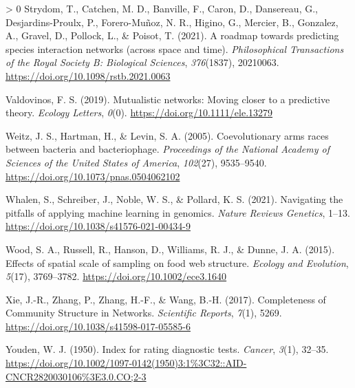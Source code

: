 \documentclass[10pt,oneside]{article}
\newlength{\cslhangindent}
\newenvironment{CSLReferences}[3] %
 {%
  \setlength{\parindent}{0pt}
  \ifodd #1 \everypar{\setlength{\hangindent}{\cslhangindent}}\ignorespaces\fi
  \ifnum #2 > 0
  \setlength{\parskip}{#2\baselineskip}
  \fi
 }%
 {}
\begin{document}
\begin{CSLReferences}{1}{0}
\leavevmode\hypertarget{ref-Strydom2021RoaPre}{}%
Strydom, T., Catchen, M. D., Banville, F., Caron, D., Dansereau, G.,
Desjardins-Proulx, P., Forero-Muñoz, N. R., Higino, G., Mercier, B.,
Gonzalez, A., Gravel, D., Pollock, L., \& Poisot, T. (2021). A roadmap
towards predicting species interaction networks (across space and time).
\emph{Philosophical Transactions of the Royal Society B: Biological
Sciences}, \emph{376}(1837), 20210063.
\url{https://doi.org/10.1098/rstb.2021.0063}

\leavevmode\hypertarget{ref-Valdovinos2019MutNet}{}%
Valdovinos, F. S. (2019). Mutualistic networks: Moving closer to a
predictive theory. \emph{Ecology Letters}, \emph{0}(0).
\url{https://doi.org/10.1111/ele.13279}

\leavevmode\hypertarget{ref-Weitz2005CoeArm}{}%
Weitz, J. S., Hartman, H., \& Levin, S. A. (2005). Coevolutionary arms
races between bacteria and bacteriophage. \emph{Proceedings of the
National Academy of Sciences of the United States of America},
\emph{102}(27), 9535--9540.
\url{https://doi.org/10.1073/pnas.0504062102}

\leavevmode\hypertarget{ref-Whalen2021NavPit}{}%
Whalen, S., Schreiber, J., Noble, W. S., \& Pollard, K. S. (2021).
Navigating the pitfalls of applying machine learning in genomics.
\emph{Nature Reviews Genetics}, 1--13.
\url{https://doi.org/10.1038/s41576-021-00434-9}

\leavevmode\hypertarget{ref-Wood2015EffSpa}{}%
Wood, S. A., Russell, R., Hanson, D., Williams, R. J., \& Dunne, J. A.
(2015). Effects of spatial scale of sampling on food web structure.
\emph{Ecology and Evolution}, \emph{5}(17), 3769--3782.
\url{https://doi.org/10.1002/ece3.1640}

\leavevmode\hypertarget{ref-Xie2017ComCom}{}%
Xie, J.-R., Zhang, P., Zhang, H.-F., \& Wang, B.-H. (2017). Completeness
of Community Structure in Networks. \emph{Scientific Reports},
\emph{7}(1), 5269. \url{https://doi.org/10.1038/s41598-017-05585-6}

\leavevmode\hypertarget{ref-Youden1950IndRat}{}%
Youden, W. J. (1950). Index for rating diagnostic tests. \emph{Cancer},
\emph{3}(1), 32--35.
\url{https://doi.org/10.1002/1097-0142(1950)3:1\%3C32::AID-CNCR2820030106\%3E3.0.CO;2-3}

\end{CSLReferences}
\end{document}
